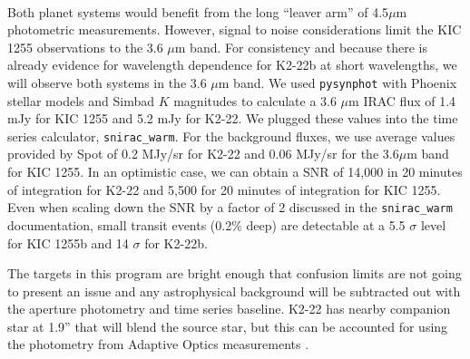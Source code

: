 \documentclass[letterpaper,12pt]{article}
\begin{document}
\\
Both planet systems would benefit from the long ``leaver arm'' of 4.5$\mu$m photometric measurements. However, signal to noise considerations limit the KIC 1255 observations to the 3.6 $\mu$m band.
For consistency and because there is already evidence for wavelength dependence for K2-22b at short wavelengths, we will observe both systems in the 3.6 $\mu$m band.
We used \texttt{pysynphot} with Phoenix stellar models and Simbad $K$ magnitudes to calculate a 3.6 $\mu$m IRAC flux of 1.4 mJy for KIC 1255 and 5.2 mJy for K2-22.
We plugged these values into the time series calculator, \texttt{snirac\_warm}.
For the background fluxes, we use average values provided by Spot of 0.2 MJy/sr for K2-22 and 0.06 MJy/sr for the 3.6$\mu$m band for KIC 1255.
In an optimistic case, we can obtain a SNR of 14,000 in 20 minutes of integration for K2-22 and 5,500 for 20 minutes of integration for KIC 1255.
Even when scaling down the SNR by a factor of 2 discussed in the \texttt{snirac\_warm} documentation, small transit events (0.2\% deep) are detectable at a 5.5 $\sigma$ level for KIC 1255b and 14 $\sigma$ for K2-22b.

The targets in this program are bright enough that confusion limits are not going to present an issue and any astrophysical background will be subtracted out with the aperture photometry and time series baseline. K2-22 has nearby companion star at 1.9'' that will blend the source star, but this can be accounted for using the photometry from Adaptive Optics measurements \citep{sanchis-ojedak2-22}.\newline
\end{document}
